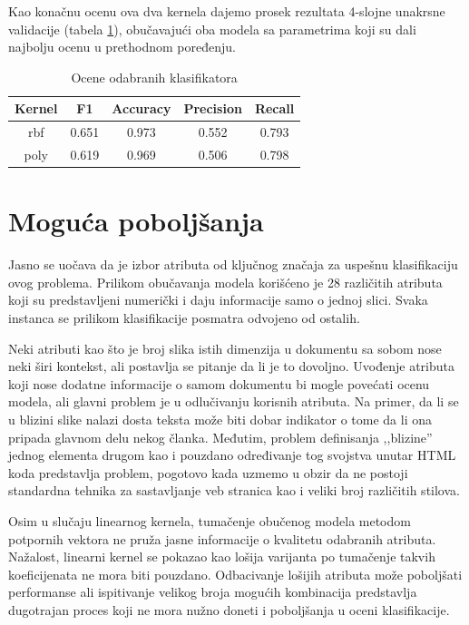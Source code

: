 \documentclass[a4paper]{article}
\begin{document}
Kao konačnu ocenu ova dva kernela dajemo prosek rezultata 4-slojne unakrsne validacije (tabela \ref{tab:svc-final-results}), obučavajući oba modela sa parametrima koji su dali najbolju ocenu u prethodnom poređenju.

\begin{table}[h!]
	\centering
	\begin{tabular}{ |c|c|c|c|c| }
		\hline
		Kernel & F1 & Accuracy & Precision & Recall \\ 
		\hline
		rbf & 0.651 & 0.973 & 0.552 & 0.793 \\
		\hline
		poly & 0.619 & 0.969 & 0.506 & 0.798 \\
		\hline
	\end{tabular}
	\caption{Ocene odabranih klasifikatora}
	\label{tab:svc-final-results}
\end{table}

\newpage

\section{Moguća poboljšanja}

Jasno se uočava da je izbor atributa od ključnog značaja za uspešnu klasifikaciju ovog problema. Prilikom obučavanja modela korišćeno je 28 različitih atributa koji su predstavljeni numerički i daju informacije samo o jednoj slici. Svaka instanca se prilikom klasifikacije posmatra odvojeno od ostalih. 

Neki atributi kao što je broj slika istih dimenzija u dokumentu sa sobom nose neki širi kontekst, ali postavlja se pitanje da li je to dovoljno. Uvođenje atributa koji nose dodatne informacije o samom dokumentu bi mogle povećati ocenu modela, ali glavni problem je u odlučivanju korisnih atributa. Na primer, da li se u blizini slike nalazi dosta teksta može biti dobar indikator o tome da li ona pripada glavnom delu nekog članka. Međutim, problem definisanja ,,blizine'' jednog elementa drugom kao i pouzdano određivanje tog svojstva unutar HTML koda predstavlja problem, pogotovo kada uzmemo u obzir da ne postoji standardna tehnika za sastavljanje veb stranica kao i veliki broj različitih stilova.

Osim u slučaju linearnog kernela, tumačenje obučenog modela metodom potpornih vektora ne pruža jasne informacije o kvalitetu odabranih atributa. Nažalost, linearni kernel se pokazao kao lošija varijanta po tumačenje takvih koeficijenata ne mora biti pouzdano. Odbacivanje lošijih atributa može poboljšati performanse ali ispitivanje velikog broja mogućih kombinacija predstavlja dugotrajan proces koji ne mora nužno doneti i poboljšanja u oceni klasifikacije.
\end{document}
